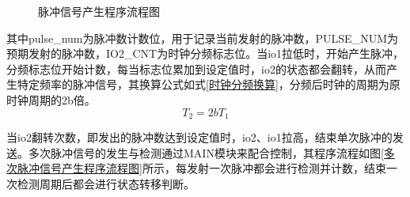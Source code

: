 \begin{figure}[ht]
	\centering
	\caption{脉冲信号产生程序流程图}
	\label{脉冲信号产生程序流程图}
\end{figure}

其中pulse\_num为脉冲数计数位，用于记录当前发射的脉冲数，PULSE\_NUM为预期发射的脉冲数，IO2\_CNT为时钟分频标志位。当io1拉低时，开始产生脉冲，分频标志位开始计数，每当标志位累加到设定值时，io2的状态都会翻转，从而产生特定频率的脉冲信号，其换算公式如式\ref{时钟分频换算}，分频后时钟的周期为原时钟周期的2b倍。
\begin{equation}
	T_2=2bT_1
	\label{时钟分频换算}
\end{equation}\par
当io2翻转次数，即发出的脉冲数达到设定值时，io2、io1拉高，结束单次脉冲的发送。多次脉冲信号的发生与检测通过MAIN模块来配合控制，其程序流程如图\ref{多次脉冲信号产生程序流程图}所示，每发射一次脉冲都会进行检测并计数，结束一次检测周期后都会进行状态转移判断。


